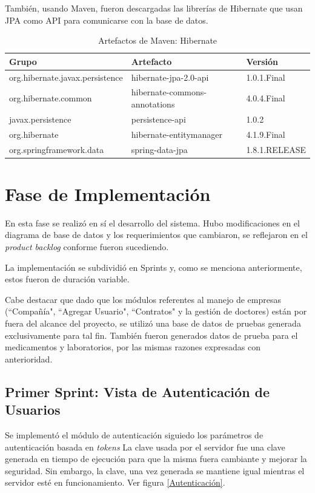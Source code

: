     También, usando Maven, fueron descargadas las librerías de Hibernate que usan JPA como API para comunicarse con la base de datos.
    
    \begin{table}[h!]
        
        \begin{center}
            \begin{tabular}{|l|l|l|}\hline
                Grupo & Artefacto & Versión \\\hline
                org.hibernate.javax.persistence & hibernate-jpa-2.0-api & 1.0.1.Final \\\hline
                org.hibernate.common & hibernate-commons-annotations & 4.0.4.Final \\\hline
                javax.persistence & persistence-api & 1.0.2 \\\hline
                org.hibernate & hibernate-entitymanager & 4.1.9.Final \\\hline
                org.springframework.data & spring-data-jpa & 1.8.1.RELEASE \\\hline
            \end{tabular}
        \end{center}
        
        \caption{Artefactos de Maven: Hibernate}
        \label{artefactos-hibernate}
    \end{table}
    
\section{Fase de Implementación} 

En esta fase se realizó en sí el desarrollo del sistema. Hubo modificaciones en el diagrama de base de datos y los requerimientos que cambiaron, se reflejaron en el \textit{product backlog} conforme fueron sucediendo.

La implementación se subdividió en Sprints y, como se menciona anteriormente, estos fueron de duración variable.

Cabe destacar que dado que los módulos referentes al manejo de empresas (``Compañía", ``Agregar Usuario", ``Contratos" y la gestión de doctores) están por fuera del alcance del proyecto, se utilizó una base de datos de pruebas generada exclusivamente para tal fin. También fueron generados datos de prueba para el medicamentos y laboratorios, por las mismas razones expresadas con anterioridad.

    \subsection{Primer Sprint: Vista de Autenticación de Usuarios}
    Se implementó el módulo de autenticación siguiedo los parámetros de autenticación basada en \textit{tokens}
    La clave usada por el servidor fue una clave generada en tiempo de ejecución para que la misma fuera cambiante y mejorar la seguridad. Sin embargo, la clave, una vez generada se mantiene igual mientras el servidor esté en funcionamiento. Ver figura \ref{Autenticación}.
    
